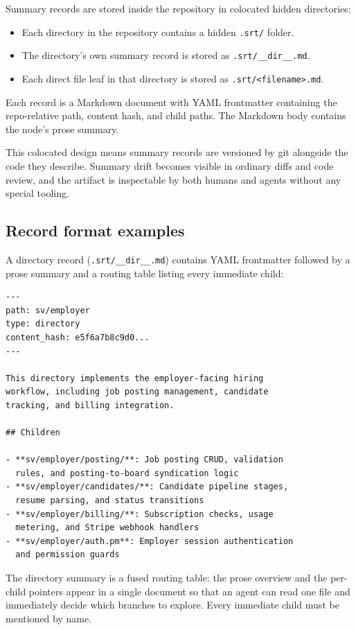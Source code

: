 \documentclass[11pt,a4paper]{article}
\begin{document}
Summary records are stored inside the repository in colocated hidden directories:
\begin{itemize}[nosep]
    \item Each directory in the repository contains a hidden \texttt{.srt/} folder.
    \item The directory's own summary record is stored as \texttt{.srt/\_\_dir\_\_.md}.
    \item Each direct file leaf in that directory is stored as \texttt{.srt/<filename>.md}.
\end{itemize}
Each record is a Markdown document with YAML frontmatter containing the repo-relative path, content hash, and child paths.
The Markdown body contains the node's prose summary.

This colocated design means summary records are versioned by git alongside the code they describe.
Summary drift becomes visible in ordinary diffs and code review, and the artifact is inspectable by both humans and agents without any special tooling.

\subsection{Record format examples}\label{app:examples}

A directory record (\texttt{.srt/\_\_dir\_\_.md}) contains YAML frontmatter followed by a prose summary and a routing table listing every immediate child:

\begin{verbatim}
---
path: sv/employer
type: directory
content_hash: e5f6a7b8c9d0...
---

This directory implements the employer-facing hiring
workflow, including job posting management, candidate
tracking, and billing integration.

## Children

- **sv/employer/posting/**: Job posting CRUD, validation
  rules, and posting-to-board syndication logic
- **sv/employer/candidates/**: Candidate pipeline stages,
  resume parsing, and status transitions
- **sv/employer/billing/**: Subscription checks, usage
  metering, and Stripe webhook handlers
- **sv/employer/auth.pm**: Employer session authentication
  and permission guards
\end{verbatim}

The directory summary is a fused routing table: the prose overview and the per-child pointers appear in a single document so that an agent can read one file and immediately decide which branches to explore.
Every immediate child must be mentioned by name.
\end{document}
